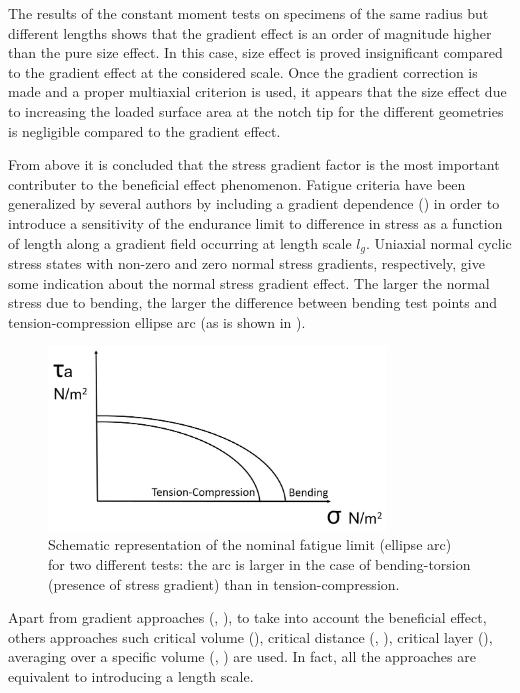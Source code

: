 The results of the constant moment tests on specimens of the same radius but different lengths shows that the gradient effect is an order of magnitude higher than the pure size effect. In this case, size effect is proved insignificant compared to the gradient effect at the considered scale. Once the gradient correction is made and a proper multiaxial criterion is used, it appears that the size effect due to increasing the loaded surface area at the notch tip for the different geometries is negligible compared to the gradient effect.

From above it is concluded that the stress gradient factor is the most important contributer to the beneficial effect phenomenon. Fatigue criteria have been generalized by several authors by including a  gradient dependence (\cite{Papadopoulos1996513}) in order to introduce a sensitivity of the endurance limit to difference in stress as a function of length along a gradient field occurring at length scale  $l_g$. Uniaxial normal cyclic stress states with non-zero and zero normal stress gradients, respectively, give some indication about the normal stress gradient effect. The larger the normal stress due to bending, the larger the difference between bending test points and tension-compression ellipse arc (as is shown in ).
\begin{figure}[!h]
	\centering
	\includegraphics[width=0.8\textwidth]{figures//fig2.jpg} 
	\caption{Schematic representation of the nominal fatigue limit (ellipse arc) for two different tests: the arc is larger in the case of bending-torsion (presence of stress gradient) than in tension-compression.}
	\label{fig2}
\end{figure}

Apart from gradient approaches (\cite{Amargier20101904}, \cite{Papadopoulos1996513}), to take into account the beneficial effect, others approaches such critical volume (\cite{maitournam2009fatigue}), critical distance (\cite{taylor2010theory}, \cite{Araujo200795}), critical layer (\cite{flavenot1983epaisseur}), averaging over a specific volume (\cite{palin2000stress}, \cite{Banvillet2003755}) are used. In fact, all the approaches are equivalent to introducing a length scale. 

